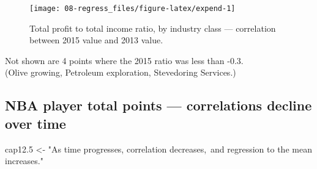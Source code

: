 \documentclass[
  10pt,
  b5paper]{book}
\newenvironment{Shaded}{\begin{snugshade}}{\end{snugshade}}
\newcommand{\FloatTok}[1]{\textcolor[rgb]{0.00,0.00,0.81}{#1}}
\newcommand{\NormalTok}[1]{#1}
\newcommand{\OtherTok}[1]{\textcolor[rgb]{0.56,0.35,0.01}{#1}}
\newcommand{\StringTok}[1]{\textcolor[rgb]{0.31,0.60,0.02}{#1}}
\begin{document}
\begin{figure}[H]
\texttt{[image: 08-regress\_files/figure-latex/expend-1]} \caption{Total profit to total income ratio, by industry class --- correlation between 2015 value and 2013 value.}\label{fig:expend}
\end{figure}

Not shown are 4 points where the 2015 ratio was less than -0.3.\\
(Olive growing, Petroleum exploration, Stevedoring Services.)

\hypertarget{nba-player-total-points-correlations-decline-over-time}{%
\subsection*{NBA player total points --- correlations decline over time}\label{nba-player-total-points-correlations-decline-over-time}}

\begin{Shaded}
\begin{Highlighting}[]
\NormalTok{cap12}\FloatTok{.5} \OtherTok{\textless{}{-}} \StringTok{"As time progresses, correlation decreases, and regression to the mean increases."}
\end{Highlighting}
\end{Shaded}
\end{document}

